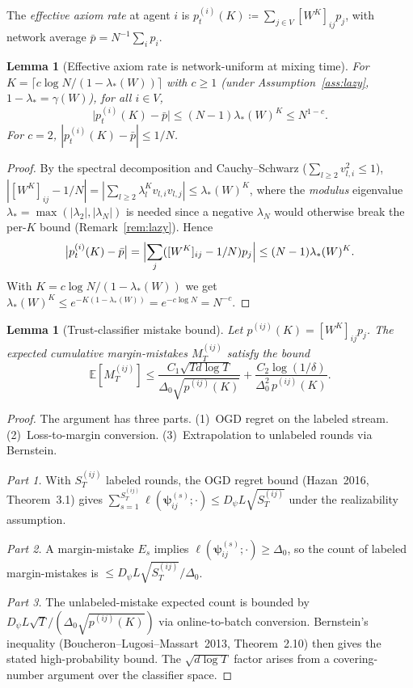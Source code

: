 \documentclass[11pt]{article}
\newtheorem{lemma}[theorem]{Lemma}
\begin{document}
The \emph{effective axiom rate} at agent $i$ is
$p_t^{(i)}(K)\coloneqq\sum_{j\in V}[W^K]_{ij}p_j$,
with network average $\bar{p}=N^{-1}\sum_i p_i$.

\begin{lemma}[Effective axiom rate is network-uniform at mixing time]
\label{lem:prop}
For $K=\lceil c\log N/(1-\lambda_*(W))\rceil$ with $c\geq 1$
(under Assumption~\ref{ass:lazy}, $1-\lambda_*=\gamma(W)$), for all $i\in V$,
\[
\bigl|p_t^{(i)}(K)-\bar{p}\bigr|
\leq(N-1)\lambda_*(W)^K\leq N^{1-c}.
\]
For $c=2$, $|p_t^{(i)}(K)-\bar{p}|\leq 1/N$.
\end{lemma}

\begin{proof}
By the spectral decomposition and Cauchy--Schwarz
($\sum_{l\geq2}v_{l,i}^2\leq1$),
$|[W^K]_{ij}-1/N|=|\sum_{l\geq2}\lambda_l^K v_{l,i}v_{l,j}|\leq\lambda_*(W)^K$,
where the \emph{modulus} eigenvalue $\lambda_*=\max(|\lambda_2|,|\lambda_N|)$
is needed since a negative $\lambda_N$ would otherwise break the per-$K$
bound (Remark~\ref{rem:lazy}).  Hence
\[
\bigl|p_t^{(i)}(K)-\bar{p}\bigr|
=\Bigl|\sum_j([W^K]_{ij}-1/N)p_j\Bigr|
\leq(N-1)\lambda_*(W)^K.
\]
With $K=c\log N/(1-\lambda_*(W))$ we get
$\lambda_*(W)^K\leq e^{-K(1-\lambda_*(W))}=e^{-c\log N}=N^{-c}$.
\end{proof}

\begin{lemma}[Trust-classifier mistake bound]\label{lem:trust_mistakes}
Let $p^{(ij)}(K)=[W^K]_{ij}p_j$.  The expected cumulative
margin-mistakes $M_T^{(ij)}$ satisfy the bound
\[
\mathbb{E}[M_T^{(ij)}]
\leq\frac{C_1\sqrt{Td\log T}}{\Delta_0\sqrt{p^{(ij)}(K)}}
+\frac{C_2\log(1/\delta)}{\Delta_0^2\,p^{(ij)}(K)}.
\]
\end{lemma}

\begin{proof}
The argument has three parts. (1)~OGD regret on the labeled stream.
(2)~Loss-to-margin conversion. (3)~Extrapolation to unlabeled rounds via Bernstein.

\textit{Part 1.}  With $S_T^{(ij)}$ labeled rounds, the OGD
regret bound (Hazan~2016, Theorem~3.1) gives
$\sum_{s=1}^{S_T^{(ij)}}\ell(\bm{\psi}_{ij}^{(s)};\cdot)
\leq D_\psi L\sqrt{S_T^{(ij)}}$
under the realizability assumption.

\textit{Part 2.}  A margin-mistake $E_s$ implies
$\ell(\bm{\psi}_{ij}^{(s)};\cdot)\geq\Delta_0$, so the count of
labeled margin-mistakes is $\leq D_\psi L\sqrt{S_T^{(ij)}}/\Delta_0$.

\textit{Part 3.}  The unlabeled-mistake expected count is bounded by
$D_\psi L\sqrt{T}/(\Delta_0\sqrt{p^{(ij)}(K)})$ via online-to-batch
conversion.  Bernstein's inequality (Boucheron--Lugosi--Massart~2013,
Theorem~2.10) then gives the stated high-probability bound.
The $\sqrt{d\log T}$ factor arises from a covering-number
argument over the classifier space.
\end{proof}
\end{document}
